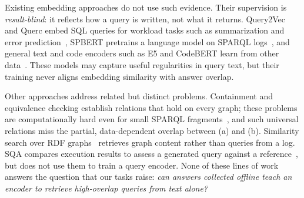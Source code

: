 \documentclass[runningheads]{llncs}
\begin{document}
Existing embedding approaches do not use such evidence. Their supervision is
\emph{result-blind}: it reflects how a query is written, not what it returns.
Query2Vec and Querc embed SQL queries for workload tasks such as
summarization and error prediction~\cite{jain2018query2vec,jain2019querc},
SPBERT pretrains a language model on SPARQL logs~\cite{tran2021spbert}, and
general text and code encoders such as E5 and CodeBERT learn from other
data~\cite{wang2022e5,feng2020codebert}. These models may capture useful
regularities in query text, but their training never aligns embedding
similarity with answer overlap.

Other approaches address related but distinct problems. Containment and
equivalence checking establish relations that hold on every graph; these
problems are computationally hard even for small SPARQL
fragments~\cite{pichler2014containment}, and such universal relations miss
the partial, data-dependent overlap between (a) and (b). Similarity search
over RDF graphs~\cite{zheng2016sparqlsimilarity,calisto2025graphsimilarity}
retrieves graph content rather than queries from a log. SQA compares
execution results to assess a generated query against a
reference~\cite{bao2026sqa}, but does not use them to train a query encoder.
None of these lines of work answers the question that our tasks raise:
\emph{can answers collected offline teach an encoder to retrieve
high-overlap queries from text alone?}
\end{document}
